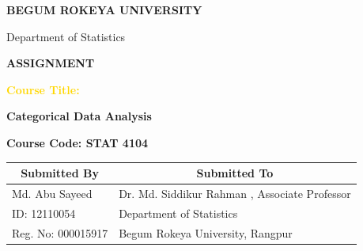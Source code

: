 \documentclass[12pt]{article}
\begin{document}
\pagecolor{white}

\begin{titlepage}

\pagecolor{lightblue}


\begin{center}

\vspace*{1cm}

{\Huge \bfseries \textcolor{mainblue}{BEGUM ROKEYA UNIVERSITY}}

\vspace{0.3cm}

{\Large Department of Statistics}

\vspace{1.5cm}

\colorbox{mainblue}{
\parbox{0.8\textwidth}{
\centering
\vspace{0.5cm}
{\Huge \color{white} \bfseries ASSIGNMENT}
\vspace{0.5cm}
}}

\vspace{1.8cm}

{\Large \textbf{\textcolor{gold}{Course Title:}}}

\vspace{0.4cm}

{\huge \bfseries \textcolor{mainblue}{Categorical Data Analysis}}

\vspace{0.8cm}

{\Large \textbf{Course Code: STAT 4104}}

\vspace{2cm}

\renewcommand{\arraystretch}{2}

\begin{tabular}{|p{7cm}|p{7cm}|}
\hline
\multicolumn{1}{|c|}{\textbf{Submitted By}} & 
\multicolumn{1}{c|}{\textbf{Submitted To}} \\
\hline
Md. Abu Sayeed &  Dr. Md. Siddikur Rahman ,     Associate Professor\\
\hline
ID: 12110054 & Department of Statistics \\
\hline
Reg. No: 000015917 & Begum Rokeya University, Rangpur \\
\hline
\end{tabular}


\end{center}
\end{titlepage}
\end{document}
